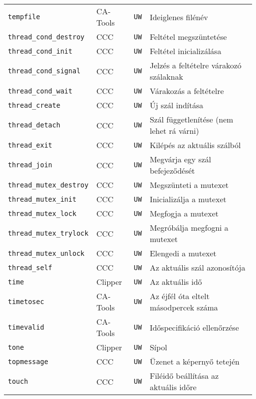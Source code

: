\begin{tabular}{|l|l|l|l|}
\verb!tempfile!                    & CA-Tools &  {\tt UW} & Ideiglenes filénév\\
\verb!thread_cond_destroy!         & CCC      &  {\tt UW} & Feltétel megszüntetése\\
\verb!thread_cond_init!            & CCC      &  {\tt UW} & Feltétel inicializálása\\
\verb!thread_cond_signal!          & CCC      &  {\tt UW} & Jelzés a feltételre várakozó szálaknak\\
\verb!thread_cond_wait!            & CCC      &  {\tt UW} & Várakozás a feltételre\\
\verb!thread_create!               & CCC      &  {\tt UW} & Új szál indítása\\
\verb!thread_detach!               & CCC      &  {\tt UW} & Szál függetlenítése (nem lehet rá várni)\\
\verb!thread_exit!                 & CCC      &  {\tt UW} & Kilépés az aktuális szálból\\
\verb!thread_join!                 & CCC      &  {\tt UW} & Megvárja egy szál befejeződését\\
\verb!thread_mutex_destroy!        & CCC      &  {\tt UW} & Megszünteti a mutexet\\
\verb!thread_mutex_init!           & CCC      &  {\tt UW} & Inicializálja a mutexet\\
\verb!thread_mutex_lock!           & CCC      &  {\tt UW} & Megfogja a mutexet\\   
\verb!thread_mutex_trylock!        & CCC      &  {\tt UW} & Megróbálja megfogni a mutexet\\   
\verb!thread_mutex_unlock!         & CCC      &  {\tt UW} & Elengedi a mutexet\\
\verb!thread_self!                 & CCC      &  {\tt UW} & Az aktuális szál azonosítója\\
\verb!time!                        & Clipper  &  {\tt UW} & Az aktuális idő\\
\verb!timetosec!                   & CA-Tools &  {\tt UW} & Az éjfél óta eltelt másodpercek száma\\
\verb!timevalid!                   & CA-Tools &  {\tt UW} & Időspecifikáció ellenőrzése\\
\verb!tone!                        & Clipper  &  {\tt UW} & Sípol\\   
\verb!topmessage!                  & CCC      &  {\tt UW} & Üzenet a képernyő tetején\\
\verb!touch!                       & CCC      &  {\tt UW} & Filéidő beállítása az aktuális időre\\   

\end{tabular}
